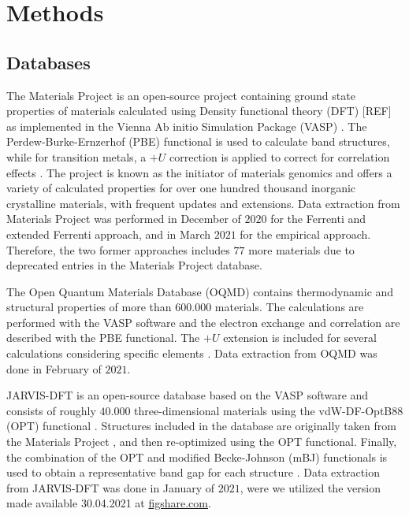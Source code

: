 \documentclass[superscriptaddress,unsortedaddress,
 amsmath,amssymb,
 aps,
]{revtex4-2}
\begin{document}
\section*{Methods}

\subsection*{Databases}
The Materials Project \cite{Jain2013, Jain2018} is an open-source project containing ground state properties of materials calculated using Density functional theory (DFT) [REF] as implemented in the Vienna Ab initio Simulation Package (VASP) \cite{Kresse1996}. The Perdew-Burke-Ernzerhof \cite{Perdew1996} (PBE) functional is used to calculate band structures, while for transition metals, a $+U$ correction is applied to correct for correlation effects \cite{Wang2006}. The project is known as the initiator of materials genomics and offers a variety of calculated properties for over one hundred thousand inorganic crystalline materials, with frequent updates and extensions. Data extraction from Materials Project was performed in December of $2020$ for the Ferrenti and extended Ferrenti approach, and in March $2021$ for the empirical approach. Therefore, the two former approaches includes $77$ more materials due to deprecated entries in the Materials Project database.

The Open Quantum Materials Database (OQMD) \cite{Saal2013, Kirklin2015} contains thermodynamic and structural properties of more than $600.000$  materials. The calculations are performed with the VASP software and the electron exchange and correlation are described with the PBE functional. The $+U$ extension is included for several calculations considering specific elements \cite{Stevanovic2012}. Data extraction from OQMD was done in February of $2021$. 

JARVIS-DFT \cite{Choudhary2020} is an open-source database based on the VASP software and consists of roughly $40.000$ three-dimensional materials using the vdW-DF-OptB88 (OPT) functional \cite{Thonhauser2007, Klimes2011}. Structures included in the database are originally taken from the Materials 
Project \cite{Jain2013, Jain2018}, and then re-optimized using the OPT functional. Finally, the combination of the OPT and modified Becke-Johnson (mBJ) functionals \cite{Tran2009} is used to obtain a representative band gap for each structure \cite{Choudhary2018a}. Data extraction from JARVIS-DFT was done in January of $2021$, were we utilized the version made available 30.04.2021 at \url{figshare.com}.
\end{document}
